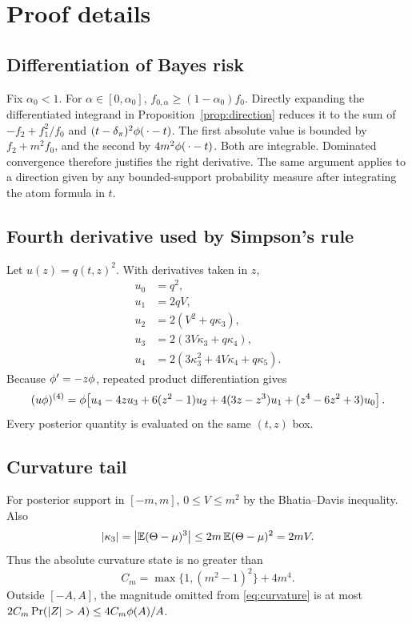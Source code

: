 \section{Proof details}
\label{app:proofs}

\subsection{Differentiation of Bayes risk}

Fix $\alpha_0<1$.  For $\alpha\in[0,\alpha_0]$,
$f_{0,\alpha}\ge(1-\alpha_0)f_0$.  Directly expanding the differentiated
integrand in Proposition~\ref{prop:direction} reduces it to the sum of
$-f_2+f_1^2/f_0$ and
$(t-\delta_\pi)^2\phi(\,\cdot-t)$.  The first absolute value is bounded by
$f_2+m^2f_0$, and the second by $4m^2\phi(\,\cdot-t)$.  Both are integrable.
Dominated convergence therefore justifies the right derivative.  The same
argument applies to a direction given by any bounded-support probability
measure after integrating the atom formula in $t$.

\subsection{Fourth derivative used by Simpson's rule}

Let $u(z)=q(t,z)^2$.  With derivatives taken in $z$,
\begin{align*}
u_0&=q^2,\\
u_1&=2qV,\\
u_2&=2(V^2+q\kappa_3),\\
u_3&=2(3V\kappa_3+q\kappa_4),\\
u_4&=2(3\kappa_3^2+4V\kappa_4+q\kappa_5).
\end{align*}
Because $\phi'=-z\phi$, repeated product differentiation gives
\[
(u\phi)^{(4)}
=\phi\!\left[
u_4-4zu_3+6(z^2-1)u_2+4(3z-z^3)u_1
 +(z^4-6z^2+3)u_0\right].
\]
Every posterior quantity is evaluated on the same $(t,z)$ box.

\subsection{Curvature tail}

For posterior support in $[-m,m]$, $0\le V\le m^2$ by the
Bhatia--Davis inequality.  Also
\[
 |\kappa_3|=\left|\mathbb E(\Theta-\mu)^3\right|
 \le 2m\,\mathbb E(\Theta-\mu)^2=2mV.
\]
Thus the absolute curvature state is no greater than
\[
C_m=\max\{1,(m^2-1)^2\}+4m^4.
\]
Outside $[-A,A]$, the magnitude omitted from \eqref{eq:curvature} is at most
$2C_m\Pr(|Z|>A)\le4C_m\phiN(A)/A$.

